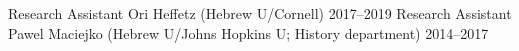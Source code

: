 


\begin{cvhonors}

  \cvhonor
    {Research Assistant} %
    {Ori Heffetz (Hebrew U/Cornell)} %
    {} %
    {2017--2019} %
  \cvhonor
    {Research Assistant} %
    {Pawel Maciejko (Hebrew U/Johns Hopkins U; History department)} %
    {} %
    {2014--2017} %



\end{cvhonors}








